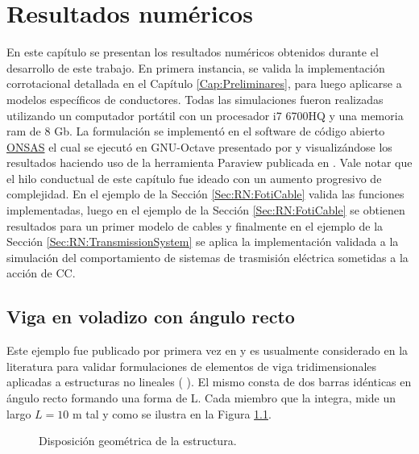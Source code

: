 \chapter{Resultados numéricos}\label{Cap:ResultadosNumericos}
\linenumbers
En este capítulo se presentan los resultados numéricos obtenidos durante el desarrollo de este trabajo. En primera instancia, se valida la implementación corrotacional detallada en el Capítulo \ref{Cap:Preliminares}, para luego aplicarse a modelos específicos de conductores. Todas las simulaciones fueron realizadas utilizando un computador portátil con un procesador i7 6700HQ y una memoria ram de 8 Gb. La formulación se implementó en el software de código abierto \href{https://github.com/ONSAS/ONSAS/}{ONSAS} el cual se ejecutó en GNU-Octave presentado por \cite{eaton2007gnu} y visualizándose los resultados haciendo uso de la herramienta Paraview publicada en \cite{ahrens2014image}. Vale notar que el hilo conductual de este capítulo fue ideado con un aumento progresivo de complejidad. En el ejemplo de la Sección \ref{Sec:RN:FotiCable} valida las funciones implementadas, luego en el ejemplo de la Sección \ref{Sec:RN:FotiCable} se obtienen resultados para un primer modelo de cables y finalmente en el ejemplo de la Sección \ref{Sec:RN:TransmissionSystem} se aplica la implementación validada a la simulación del comportamiento de sistemas de trasmisión eléctrica sometidas a la acción de CC.


\section{Viga en voladizo con ángulo recto}\label{Sec:RN:RightAngle}
Este ejemplo fue publicado por primera vez en \cite{simo1988dynamics} y es usualmente considerado en la literatura para validar formulaciones de elementos de viga tridimensionales aplicadas a estructuras no lineales (\cite{albino2018co} \cite{Le2014}). El mismo consta de dos barras idénticas en ángulo recto formando una forma de L. Cada miembro que la integra, mide un largo $L=10$ m tal y como se ilustra en la Figura \ref{fig:RN:RA:esquemas}.


\begingroup
\centering
\begin{figure}[htbp]
	\centering
	\label{fig:RN:RA:Ilusxy}
	\label{fig:RN:RA:Ilusyz}
	\caption{Disposición geométrica de la estructura.} 	\label{fig:RN:RA:esquemas}
\end{figure}
\endgroup


